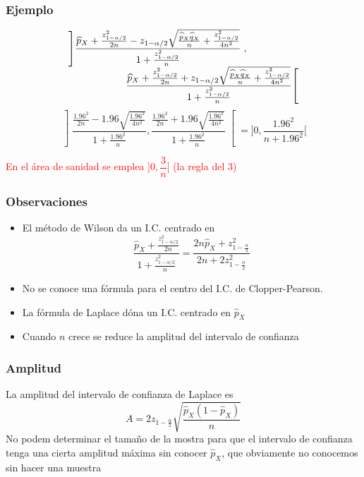 \documentclass[12pt,t]{beamer}\usepackage[]{graphicx}\usepackage[]{color}
\newcommand{\red}[1]{\textcolor{red}{#1}}
\theoremstyle{plain}
\theoremstyle{definition}
\begin{document}
\begin{frame}
\frametitle{Ejemplo}
\vspace*{-5ex}

{\small
$$
\begin{array}{l}
\displaystyle \left]\frac{\widehat{p}_{X}+\frac{z_{1-{\alpha}/{2}}^2}{2n}-z_{1-{\alpha}/{2}}\sqrt{\frac{\widehat{p}_{X}\widehat{q}_{X}}{n}+\frac{z_{1-{\alpha}/{2}}^2}{4n^2}}}{1+\frac{z_{1-{\alpha}/{2}}^2}{n}}\right.,\\[2ex]
\hspace*{2cm} \displaystyle \left.\frac{\widehat{p}_{X}+\frac{z_{1-{\alpha}/{2}}^2}{2n}+z_{1-{\alpha}/{2}}\sqrt{\frac{\widehat{p}_{X}\widehat{q}_{X}}{n}+\frac{z_{1-{\alpha}/{2}}^2}{4n^2}}}{1+\frac{z_{1-{\alpha}/{2}}^2}{n}}\right[
\end{array}
$$
$$
\left]\frac{\frac{1.96^2}{2n}- 1.96\sqrt{\frac{1.96^2}{4n^2}}}{1+\frac{1.96^2}{n}},
\frac{\frac{1.96^2}{2n}+ 1.96\sqrt{\frac{1.96^2}{4n^2}}}{1+\frac{1.96^2}{n}}\right[
=\Big]0,\frac{1.96^2}{n+1.96^2}\Big[
$$

}

\red{En el área de sanidad se emplea  $\Big]0,\dfrac{3}{n}\Big[$ (la regla del 3)}


\end{frame}


\begin{frame}
\frametitle{Observaciones }
\begin{itemize}
\item El método  de Wilson da un I.C. centrado   en
$$
\frac{\widehat{p}_{X}+\frac{z_{1-{\alpha}/{2}}^2}{2n}}{1+\frac{z_{1-{\alpha}/{2}}^2}{n}}
=\frac{2n\widehat{p}_{X}+ z_{1-\frac{\alpha}{2}}^2}{2n+2 z_{1-\frac{\alpha}{2}}^2}
$$

\item No se conoce una fórmula para el centro del I.C. de Clopper-Pearson.

\item La fórmula de Laplace dóna un I.C.  centrado   en $\widehat{p}_{X}$
\medskip

\item Cuando $n$ crece se reduce la amplitud del intervalo de confianza 

\end{itemize}

\end{frame}


\begin{frame}
\frametitle{Amplitud}

La amplitud del intervalo de confianza  de Laplace es 
$$
A=2 z_{1-\frac{\alpha}{2}} \sqrt{\frac{\widehat{p}_{X} (1-\widehat{p}_{X})}{n}}
$$
No podem determinar el   tamaño  de la mostra para que el intervalo de confianza  tenga una cierta amplitud máxima sin
conocer $\widehat{p}_{X}$, que obviamente no conocemos sin hacer una muestra

\end{frame}
\end{document}
